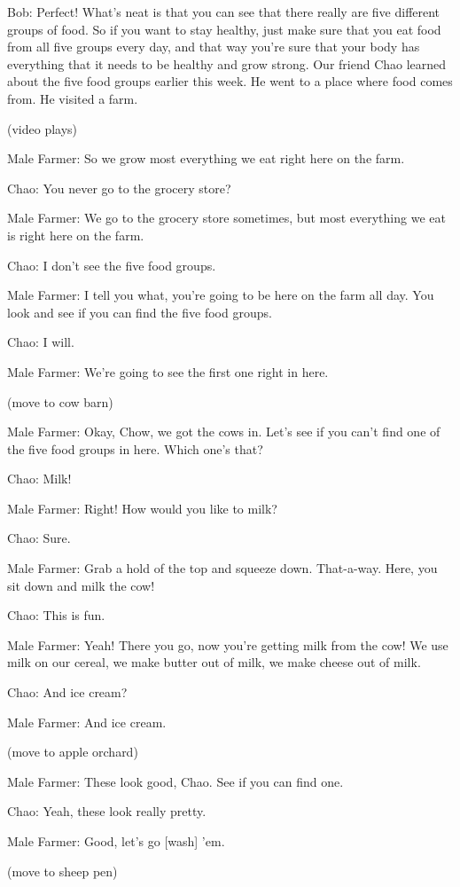 Bob: Perfect! What's neat is that you can see that there really are five different groups of food. So if you want to stay healthy, just make sure that you eat food from all five groups every day, and that way you're sure that your body has everything that it needs to be healthy and grow strong. Our friend Chao learned about the five food groups earlier this week. He went to a place where food comes from. He visited a farm.

(video plays)

Male Farmer: So we grow most everything we eat right here on the farm.

Chao: You never go to the grocery store?

Male Farmer: We go to the grocery store sometimes, but most everything we eat is right here on the farm.

Chao: I don't see the five food groups.

Male Farmer: I tell you what, you're going to be here on the farm all day. You look and see if you can find the five food groups.

Chao: I will.

Male Farmer: We're going to see the first one right in here.

(move to cow barn)

Male Farmer: Okay, Chow, we got the cows in. Let's see if you can't find one of the five food groups in here. Which one's that?

Chao: Milk!

Male Farmer: Right! How would you like to milk?

Chao: Sure.

Male Farmer: Grab a hold of the top and squeeze down. That-a-way. Here, you sit down and milk the cow!

Chao: This is fun.

Male Farmer: Yeah! There you go, now you're getting milk from the cow! We use milk on our cereal, we make butter out of milk, we make cheese out of milk.

Chao: And ice cream?

Male Farmer: And ice cream.

(move to apple orchard)

Male Farmer: These look good, Chao. See if you can find one.

Chao: Yeah, these look really pretty.

Male Farmer: Good, let's go [wash] 'em.

(move to sheep pen)

